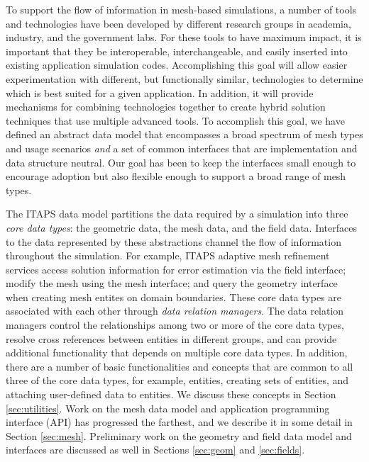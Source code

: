 To support the flow of information in mesh-based simulations, a number
of tools and technologies have been developed by different research
groups in academia, industry, and the government labs.  For these tools
to have maximum impact, it is important that they be interoperable,
interchangeable, and easily inserted into existing application
simulation codes.  Accomplishing this goal will allow easier
experimentation with different, but functionally similar, technologies
to determine which is best suited for a given application.  In
addition, it will provide mechanisms for combining technologies
together to create hybrid solution techniques that use multiple
advanced tools.  To accomplish this goal, we have defined an abstract
data model that encompasses a broad spectrum of mesh types and usage
scenarios {\it and} a set of common interfaces that are implementation
and data structure neutral.  Our goal has been to keep the interfaces
small enough to encourage adoption but also flexible enough to support
a broad range of mesh types.

The ITAPS data model partitions the data required by a simulation
into three {\it core data types}: the geometric data, the mesh
data, and the field data.  Interfaces to the data represented by these
abstractions channel the flow of information throughout the
simulation.  For example, ITAPS adaptive mesh refinement services
access solution information for error estimation via the field
interface; modify the mesh using the mesh interface; and query the
geometry interface when creating mesh entites on domain boundaries.
These core data types are associated with each other through {\it data
relation managers}. The data relation managers control the
relationships among two or more of the core data types, resolve cross
references between entities in different groups, and can provide
additional functionality that depends on multiple core data types.
In addition, there are a number of basic functionalities and concepts
that are common to all three of the core data types, for example,
entities, creating sets of entities, and attaching user-defined data
to entities.  We discuss these concepts in Section \ref{sec:utilities}.
Work on the mesh data model and application programming interface
(API) has progressed the farthest, and we describe it in some detail
in Section \ref{sec:mesh}.  Preliminary work on the geometry and field
data model and interfaces are discussed as well in Sections \ref{sec:geom} and
\ref{sec:fields}.

